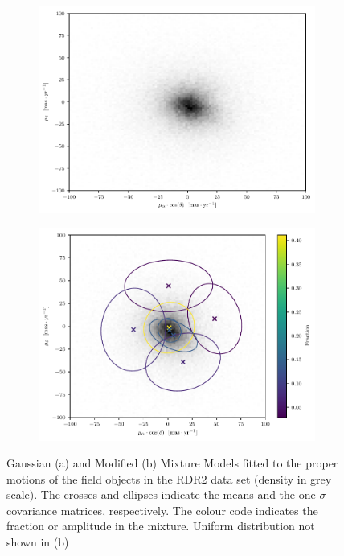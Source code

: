 \begin{figure}[ht!]
    \centering
    \begin{subfigure}[t]{0.45\textwidth}
        \includegraphics[page=3,width=\textwidth]{background/Figures/GMM-PM-BIC=15.pdf}
        \caption{}
        \label{fig:fpmGMM}
    \end{subfigure}
    \begin{subfigure}[t]{0.45\textwidth}
      \includegraphics[page=3,width=\textwidth]{background/Figures/GMM-PM-BIC2-U+7G.pdf}
        \caption{}
        \label{fig:fpmMMM} 
    \end{subfigure}
\caption{Gaussian (a) and Modified (b) Mixture Models fitted to the proper motions of the field objects in the RDR2 data set (density in grey scale). The crosses and ellipses indicate the means and the one-$\sigma$ covariance matrices, respectively. The colour code indicates the fraction or amplitude in the mixture. Uniform distribution not shown in (b)}
\label{fig:GMMvsMMM}
\end{figure}

